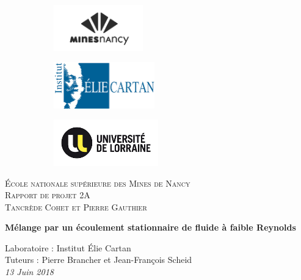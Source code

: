 \documentclass[a4paper,12pt,titlepage]{report}
\begin{document}
\begin{titlepage}
 
	\begin{center}
	\begin{figure}[!h]
	\centering	
		\begin{subfigure}[b]{0.3\textwidth}
		\includegraphics[height = 2cm, keepaspectratio]{graphes/mines_nancy.png}
		\end{subfigure}
		\begin{subfigure}[b]{0.3\textwidth}
		\includegraphics[height = 2cm, keepaspectratio]{graphes/elie_cartan.png}
		\end{subfigure}
		\begin{subfigure}[b]{0.3\textwidth}
		\includegraphics[height = 2cm, keepaspectratio]{graphes/univ_lorraine.png}
	\end{subfigure}
	\end{figure}
 
	\textsc{École nationale supérieure des Mines de Nancy}\\[2cm]
	\textsc{Rapport de projet 2A}\\[1cm]
	\textsc{Tancrède Cohet et Pierre Gauthier}\\[1cm]
 
	\begin{doublespace}
		{ \huge \bfseries{Mélange par un écoulement stationnaire de fluide à faible 				Reynolds}}\\[2cm]
	\end{doublespace}
	\textmd{Laboratoire : Institut Élie Cartan}\\[1cm]
	\textmd{Tuteurs : Pierre Brancher et Jean-François Scheid }\\[1cm]
 
	\vfill
	{\textit{{\large 13 Juin 2018}}}
 
	\end{center}
\end{titlepage}
\end{document}
